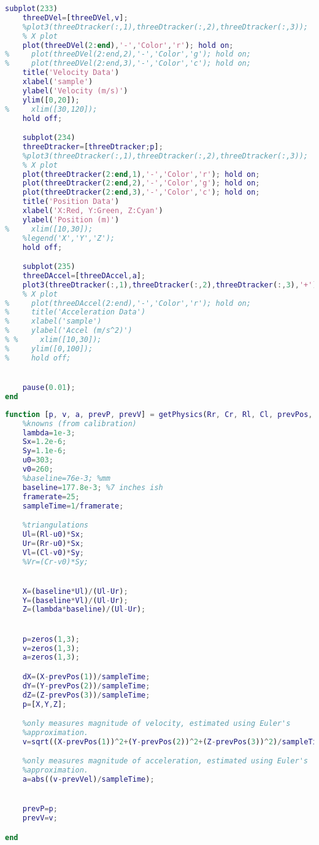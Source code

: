 \documentclass{IEEEtran}
\begin{document}
\begin{lstlisting}[caption={MATLAB Ball Hold Tracking Demo},label={lst:ballHoldDemo},language=MATLAB]
    subplot(233)
    threeDVel=[threeDVel,v];
    %plot3(threeDtracker(:,1),threeDtracker(:,2),threeDtracker(:,3));
    % X plot
    plot(threeDVel(2:end),'-','Color','r'); hold on;
%     plot(threeDVel(2:end,2),'-','Color','g'); hold on;
%     plot(threeDVel(2:end,3),'-','Color','c'); hold on;
    title('Velocity Data')
    xlabel('sample')
    ylabel('Velocity (m/s)')
    ylim([0,20]);
%     xlim([30,120]);
    hold off;

    subplot(234)
    threeDtracker=[threeDtracker;p];
    %plot3(threeDtracker(:,1),threeDtracker(:,2),threeDtracker(:,3));
    % X plot
    plot(threeDtracker(2:end,1),'-','Color','r'); hold on;
    plot(threeDtracker(2:end,2),'-','Color','g'); hold on;
    plot(threeDtracker(2:end,3),'-','Color','c'); hold on;
    title('Position Data')
    xlabel('X:Red, Y:Green, Z:Cyan')
    ylabel('Position (m)')
%     xlim([10,30]);
    %legend('X','Y','Z');
    hold off;

    subplot(235)
    threeDAccel=[threeDAccel,a];
    plot3(threeDtracker(:,1),threeDtracker(:,2),threeDtracker(:,3),'+');
    % X plot
%     plot(threeDAccel(2:end),'-','Color','r'); hold on;
%     title('Acceleration Data')
%     xlabel('sample')
%     ylabel('Accel (m/s^2)')
% %     xlim([10,30]);
%     ylim([0,100]);
%     hold off;


    pause(0.01);
end
\end{lstlisting}


\begin{lstlisting}[caption={MATLAB custom getPhysics function},label={lst:getPhysics},language=MATLAB]
function [p, v, a, prevP, prevV] = getPhysics(Rr, Cr, Rl, Cl, prevPos, prevVel);
    %knowns (from calibration)
    lambda=1e-3;
    Sx=1.2e-6;
    Sy=1.1e-6;
    u0=303;
    v0=260;
    %baseline=76e-3; %mm
    baseline=177.8e-3; %7 inches ish
    framerate=25;
    sampleTime=1/framerate;

    %triangulations
    Ul=(Rl-u0)*Sx;
    Ur=(Rr-u0)*Sx;
    Vl=(Cl-v0)*Sy;
    %Vr=(Cr-v0)*Sy;


    X=(baseline*Ul)/(Ul-Ur);
    Y=(baseline*Vl)/(Ul-Ur);
    Z=(lambda*baseline)/(Ul-Ur);


    p=zeros(1,3);
    v=zeros(1,3);
    a=zeros(1,3);

    dX=(X-prevPos(1))/sampleTime;
    dY=(Y-prevPos(2))/sampleTime;
    dZ=(Z-prevPos(3))/sampleTime;
    p=[X,Y,Z];

    %only measures magnitude of velocity, estimated using Euler's
    %approximation.
    v=sqrt((X-prevPos(1))^2+(Y-prevPos(2))^2+(Z-prevPos(3))^2)/sampleTime;

    %only measures magnitude of acceleration, estimated using Euler's
    %approximation.
    a=abs((v-prevVel)/sampleTime);


    prevP=p;
    prevV=v;

end
\end{lstlisting}
\end{document}
